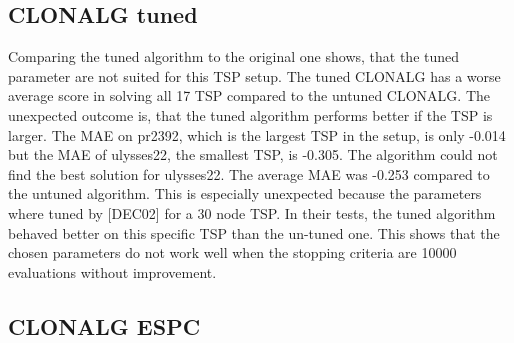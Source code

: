 \subsection{CLONALG tuned}
Comparing the tuned algorithm to the original one shows, that the tuned parameter are not suited for this TSP setup. The tuned CLONALG has a worse average score in solving all 17 TSP compared to the untuned CLONALG. The unexpected outcome is, that the tuned algorithm performs better if the TSP is larger. The MAE on pr2392, which is the largest TSP in the setup, is only -0.014 but the MAE of ulysses22, the smallest TSP, is -0.305. The algorithm could not find the best solution for ulysses22. The average MAE was -0.253 compared to the untuned algorithm. This is especially unexpected because the parameters where tuned by [DEC02] for a 30 node TSP. In their tests, the tuned algorithm behaved better on this specific TSP than the un-tuned one. This shows that the chosen parameters do not work well when the stopping criteria are 10000 evaluations without improvement.
\subsection{CLONALG ESPC}
